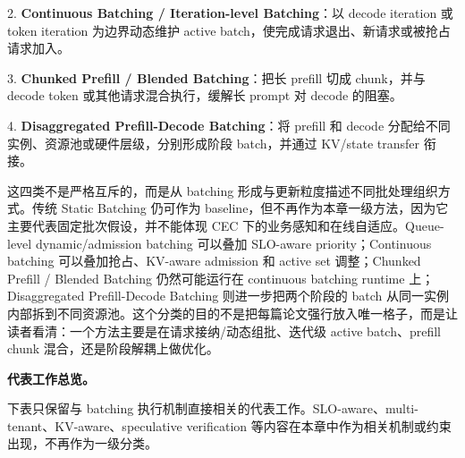 \documentclass[a4paper,10pt]{ctexart}
\begin{document}
2. \textbf{Continuous Batching / Iteration-level Batching}：以 decode iteration 或 token iteration 为边界动态维护 active batch，使完成请求退出、新请求或被抢占请求加入。


3. \textbf{Chunked Prefill / Blended Batching}：把长 prefill 切成 chunk，并与 decode token 或其他请求混合执行，缓解长 prompt 对 decode 的阻塞。


4. \textbf{Disaggregated Prefill-Decode Batching}：将 prefill 和 decode 分配给不同实例、资源池或硬件层级，分别形成阶段 batch，并通过 KV/state transfer 衔接。


这四类不是严格互斥的，而是从 batching 形成与更新粒度描述不同批处理组织方式。传统 Static Batching 仍可作为 baseline，但不再作为本章一级方法，因为它主要代表固定批次假设，并不能体现 CEC 下的业务感知和在线自适应。Queue-level dynamic/admission batching 可以叠加 SLO-aware priority；Continuous batching 可以叠加抢占、KV-aware admission 和 active set 调整；Chunked Prefill / Blended Batching 仍然可能运行在 continuous batching runtime 上；Disaggregated Prefill-Decode Batching 则进一步把两个阶段的 batch 从同一实例内部拆到不同资源池。这个分类的目的不是把每篇论文强行放入唯一格子，而是让读者看清：一个方法主要是在请求接纳/动态组批、迭代级 active batch、prefill chunk 混合，还是阶段解耦上做优化。


\textbf{代表工作总览。}


下表只保留与 batching 执行机制直接相关的代表工作。SLO-aware、multi-tenant、KV-aware、speculative verification 等内容在本章中作为相关机制或约束出现，不再作为一级分类。
\end{document}
